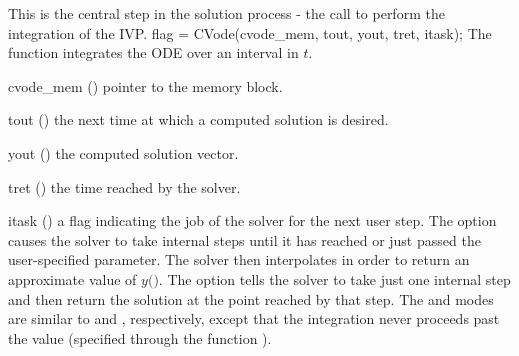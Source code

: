 This is the central step in the solution process - the call to
perform the integration of the IVP.
%
{
  flag = CVode(cvode\_mem, tout, yout, tret, itask);
}
{
  The function  integrates the ODE over an interval in $t$.
}
{
  \begin{args}
  \item[cvode\_mem] ()
    pointer to the {\cvodes} memory block.
  \item[tout] ()
    the next time at which a computed solution is desired.
  \item[yout] ()
    the computed solution vector.
  \item[tret] ()
    the time reached by the solver.
  \item[itask] ()
    a flag indicating the job of the solver for the next user step. 
    The  option causes the solver to take internal steps until   
    it has reached or just passed the user-specified 
    parameter. The solver then interpolates in order to   
    return an approximate value of $y($$)$. 
    The  option tells the solver to take just one internal step  
    and then return the solution at the point reached by that step. 
    The  and  modes are     
    similar to  and , respectively, except    
    that the integration never proceeds past the value      
     (specified through the function ).
  \end{args}
}
